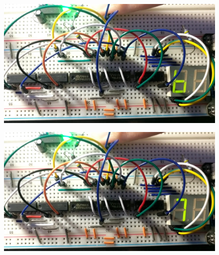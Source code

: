 \documentclass{article}
\begin{document}
\begin{figure}[ht!]
  \centering
  \includegraphics[width=\textwidth]{ECE2300L_Lab12_6.jpg}
\end{figure}
\begin{figure}[ht!]
  \centering
  \includegraphics[width=\textwidth]{ECE2300L_Lab12_7.jpg}
\end{figure}
\end{document}
